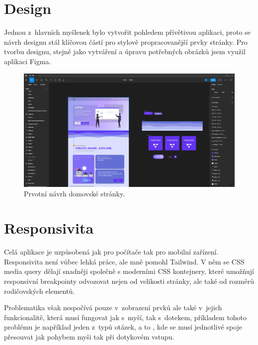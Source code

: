 \documentclass[12pt, a4paper,
openright
]{report}
\begin{document}
\section{Design}
Jednou z~hlavních myšlenek bylo vytvořit pohledem přívětivou aplikaci, proto se návrh designu stál klíčovou částí pro stylově propracovanější prvky stránky. Pro tvorbu designu, stejně jako vytváření a úpravu potřebných obrázků jsem využil aplikaci Figma.
\begin{figure}[h]
	\centering %
	\includegraphics[width=1\linewidth]{image/figma.png} 
	\caption{Prvotní návrh domovské stránky.} %
	\label{fig:figma} %
\end{figure}

\section{Responsivita}
Celá aplikace je uzpůsobená jak pro počítače tak pro mobilní zařízení. Responsivita není vůbec lehká práce, ale mně pomohl Tailwind. V něm se CSS media query dělají snadněji společně s moderními CSS kontejnery, které umožňují responsivní breakpointy odvozovat nejen od velikosti stránky, ale také od rozměrů rodičovských elementů.

Problematika však nespočívá pouze v~zobrazení prvků ale také v~jejich funkcionalitě, která musí fungovat jak s~myší, tak s~dotekem, příkladem tohoto problému je například jeden z~typů otázek, a to , kde se musí jednotlivé spoje přesouvat jak pohybem myši tak při dotykovém vstupu.
\end{document}
